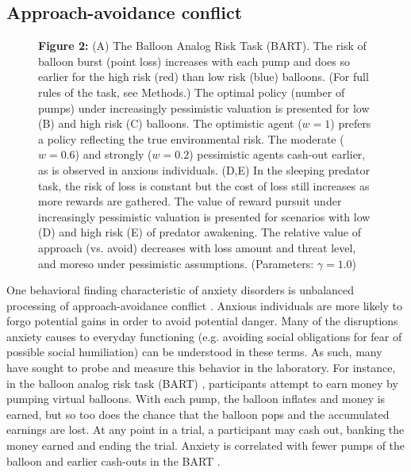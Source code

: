 \documentclass[11pt]{article} %
\begin{document}
\subsection{Approach-avoidance conflict}

\begin{figure}
  \centerline{%
  }
  \par \textbf{Figure 2:} (A) The Balloon Analog Risk Task (BART)\citep{Lejuez2002,Maner2007, ramirez2015}. The risk of balloon burst (point loss) increases with each pump and does so earlier for the high risk (red) than low risk (blue) balloons. (For full rules of the task, see Methods.) The optimal policy (number of pumps) under increasingly pessimistic valuation is presented for low (B) and high risk (C) balloons. The optimistic agent ($w=1$) prefers a policy reflecting the true environmental risk. The moderate ($w=0.6$) and strongly ($w=0.2$) pessimistic agents cash-out earlier, as is observed in anxious individuals. (D,E) In the sleeping predator task, the risk of loss is constant but the cost of loss still increases as more rewards are gathered. The value of reward pursuit under increasingly pessimistic valuation is presented for scenarios with low (D) and high risk (E)  of predator awakening. The relative value of approach (vs. avoid) decreases with loss amount and threat level, and moreso under pessimistic assumptions. (Parameters: $\gamma = 1.0$)
\end{figure}

One behavioral finding characteristic of anxiety disorders is unbalanced processing of approach-avoidance conflict \citep{aupperle2010}. Anxious individuals are more likely to forgo potential gains in order to avoid potential danger. Many of the disruptions anxiety causes to everyday functioning (e.g. avoiding social obligations for fear of possible social humiliation) can be understood in these terms. As such, many have sought to probe and measure this behavior in the laboratory. For instance, in the balloon analog risk task (BART) \citep{Lejuez2002}, participants attempt to earn money by pumping virtual balloons. With each pump, the balloon inflates and money is earned, but so too does the chance that the balloon pops and the accumulated earnings are lost. At any point in a trial, a participant may cash out, banking the money earned and ending the trial. Anxiety is correlated with fewer pumps of the balloon and earlier cash-outs in the BART \citep{Maner2007, ramirez2015}.
\end{document}
